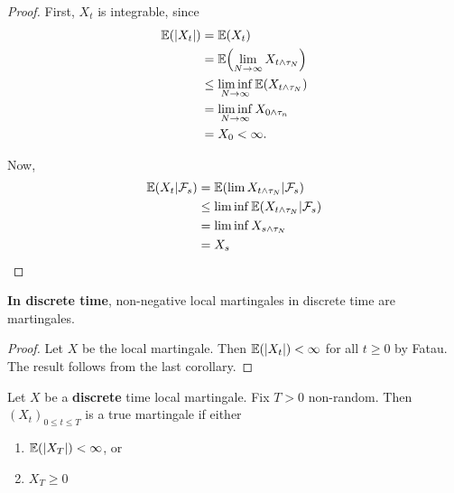 \begin{proof}
  First, $X_{t}$ is integrable, since
  \begin{align}
    \label{eq:17}
    \E{|X_{t}|} &= \E{X_{t}} \\
    &= \E{\lim_{N \rightarrow \infty} X_{t \wedge \tau_{N}}} \\
    &\leq \liminf_{N \rightarrow \infty} \E{X_{t \wedge \tau_{N}}} \\
    &= \liminf_{N \rightarrow \infty} X_{0 \wedge \tau_{n}} \\
    &= X_{0} < \infty.
  \end{align}
  
  Now,
  \begin{align}
    \label{eq:16}
    \E{X_{t} | \mathcal{F}_{s}} &= \E{\lim X_{t \wedge \tau_{N}} |
      \mathcal{F}_{s}} \\
    &\leq \liminf \E{X_{t \wedge \tau_{N}} | \mathcal{F}_{s}} \\
    &= \liminf X_{s \wedge \tau_{N}} \\
    &= X_{s}
  \end{align}
\end{proof}

\begin{corollary}
  \textbf{In discrete time}, non-negative local martingales in
  discrete time are martingales.
\end{corollary}

\begin{proof}
  Let $X$ be the local martingale. Then $\E{|X_{t}|} < \infty$ for all
  $t \geq 0$ by Fatau. The result follows from the last corollary.
\end{proof}

\begin{thm}
  \label{defn:discrete_time_models:18}
  Let $X$ be a \textbf{discrete} time local martingale. Fix $T > 0$
  non-random. Then $(X_{t})_{0 \leq t \leq T}$ is a true martingale if
  either
  \begin{enumerate}
  \item $\E{|X_{T}|} < \infty$, or
  \item $X_T \geq 0$ 
  \end{enumerate}
\end{thm}

